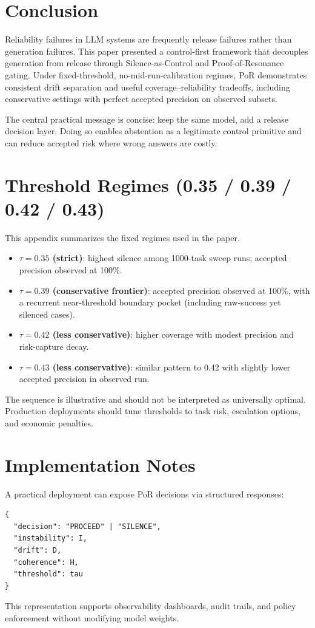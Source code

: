 \documentclass[11pt]{article}
\begin{document}
\section{Conclusion}
Reliability failures in LLM systems are frequently release failures rather than generation failures. This paper presented a control-first framework that decouples generation from release through Silence-as-Control and Proof-of-Resonance gating. Under fixed-threshold, no-mid-run-calibration regimes, PoR demonstrates consistent drift separation and useful coverage--reliability tradeoffs, including conservative settings with perfect accepted precision on observed subsets.

The central practical message is concise: keep the same model, add a release decision layer. Doing so enables abstention as a legitimate control primitive and can reduce accepted risk where wrong answers are costly.

\appendix
\section{Threshold Regimes (0.35 / 0.39 / 0.42 / 0.43)}
This appendix summarizes the fixed regimes used in the paper.
\begin{itemize}[leftmargin=1.5em]
    \item \textbf{$\tau=0.35$ (strict)}: highest silence among 1000-task sweep runs; accepted precision observed at 100\%.
    \item \textbf{$\tau=0.39$ (conservative frontier)}: accepted precision observed at 100\%, with a recurrent near-threshold boundary pocket (including raw-success yet silenced cases).
    \item \textbf{$\tau=0.42$ (less conservative)}: higher coverage with modest precision and risk-capture decay.
    \item \textbf{$\tau=0.43$ (less conservative)}: similar pattern to 0.42 with slightly lower accepted precision in observed run.
\end{itemize}

The sequence is illustrative and should not be interpreted as universally optimal. Production deployments should tune thresholds to task risk, escalation options, and economic penalties.

\section{Implementation Notes}
A practical deployment can expose PoR decisions via structured responses:
\begin{verbatim}
{
  "decision": "PROCEED" | "SILENCE",
  "instability": I,
  "drift": D,
  "coherence": H,
  "threshold": tau
}
\end{verbatim}
This representation supports observability dashboards, audit trails, and policy enforcement without modifying model weights.



\end{document}
